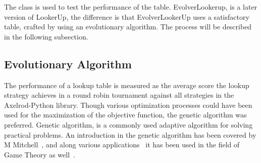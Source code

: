 
The class is used to test the performance of the table. EvolverLookerup, is a
later version of LookerUp, the difference is that EvolverLookerUp uses a satisfactory
table, crafted by using an evolutionary algorithm. The process will be described
in the following subsection.

\subsection{Evolutionary Algorithm}
\label{sub:evolutionary-algorithm}
The performance of a lookup table is measured as the average score the lookup
strategy achieves in a round robin tournament against all strategies in the
Axelrod-Python library. Though various optimization processes could have been
used for the maximization of the objective function,
the genetic algorithm was preferred. Genetic algorithm, is a commonly used adaptive
algorithm for solving practical problems. An introduction in the genetic algorithm
has been covered by M Mitchell~\cite{Mitchell1998}, and along various applications~\cite{Chang1994}
it has been used in the field of Game Theory as well~\cite{Ismail2007}.

